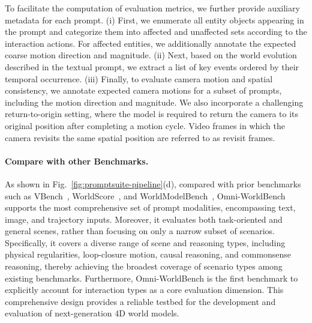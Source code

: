 To facilitate the computation of evaluation metrics, we further provide auxiliary metadata for each prompt. (i) First, we enumerate all entity objects appearing in the prompt and categorize them into affected and unaffected sets according to the interaction actions. For affected entities, we additionally annotate the expected coarse motion direction and magnitude. (ii) Next, based on the world evolution described in the textual prompt, we extract a list of key events ordered by their temporal occurrence. (iii) Finally, to evaluate camera motion and spatial consistency, we annotate expected camera motions for a subset of prompts, including the motion direction and magnitude. We also incorporate a challenging return-to-origin setting, where the model is required to return the camera to its original position after completing a motion cycle. Video frames in which the camera revisits the same spatial position are referred to as revisit frames.


\paragraph{Compare with other Benchmarks.}
As shown in Fig.~\ref{fig:promptsuite-pipeline}(d), compared with prior benchmarks such as VBench~\cite{zheng2025vbench2}, WorldScore~\cite{duan2025worldscore}, and WorldModelBench~\cite{li2025worldmodelbench}, Omni-WorldBench supports the most comprehensive set of prompt modalities, encompassing text, image, and trajectory inputs. Moreover, it evaluates both task-oriented and general scenes, rather than focusing on only a narrow subset of scenarios. Specifically, it covers a diverse range of scene and reasoning types, including physical regularities, loop-closure motion, causal reasoning, and commonsense reasoning, thereby achieving the broadest coverage of scenario types among existing benchmarks. Furthermore, Omni-WorldBench is the first benchmark to explicitly account for interaction types as a core evaluation dimension. This comprehensive design provides a reliable testbed for the development and evaluation of next-generation 4D world models.


